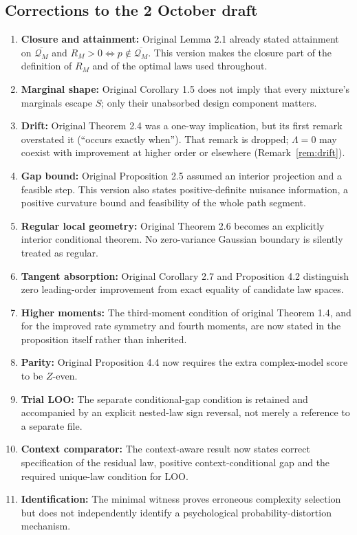 \documentclass[11pt,letterpaper]{article}
\theoremstyle{plain}
\theoremstyle{definition}
\begin{document}
\subsection{Corrections to the 2 October draft}
\begin{enumerate}
\item \textbf{Closure and attainment:} Original Lemma 2.1 already stated attainment on $\overline{\mathcal Q_M}$ and $R_M>0\iff p\notin\overline{\mathcal Q_M}$. This version makes the closure part of the definition of $R_M$ and of the optimal laws used throughout.
\item \textbf{Marginal shape:} Original Corollary 1.5 does not imply that every mixture's marginals escape $S$; only their unabsorbed design component matters.
\item \textbf{Drift:} Original Theorem 2.4 was a one-way implication, but its first remark overstated it (``occurs exactly when''). That remark is dropped; $\Lambda=0$ may coexist with improvement at higher order or elsewhere (Remark~\ref{rem:drift}).
\item \textbf{Gap bound:} Original Proposition 2.5 assumed an interior projection and a feasible step. This version also states positive-definite nuisance information, a positive curvature bound and feasibility of the whole path segment.
\item \textbf{Regular local geometry:} Original Theorem 2.6 becomes an explicitly interior conditional theorem. No zero-variance Gaussian boundary is silently treated as regular.
\item \textbf{Tangent absorption:} Original Corollary 2.7 and Proposition 4.2 distinguish zero leading-order improvement from exact equality of candidate law spaces.
\item \textbf{Higher moments:} The third-moment condition of original Theorem 1.4, and for the improved rate symmetry and fourth moments, are now stated in the proposition itself rather than inherited.
\item \textbf{Parity:} Original Proposition 4.4 now requires the extra complex-model score to be $Z$-even.
\item \textbf{Trial LOO:} The separate conditional-gap condition is retained and accompanied by an explicit nested-law sign reversal, not merely a reference to a separate file.
\item \textbf{Context comparator:} The context-aware result now states correct specification of the residual law, positive context-conditional gap and the required unique-law condition for LOO.
\item \textbf{Identification:} The minimal witness proves erroneous complexity selection but does not independently identify a psychological probability-distortion mechanism.
\end{enumerate}
\end{document}
